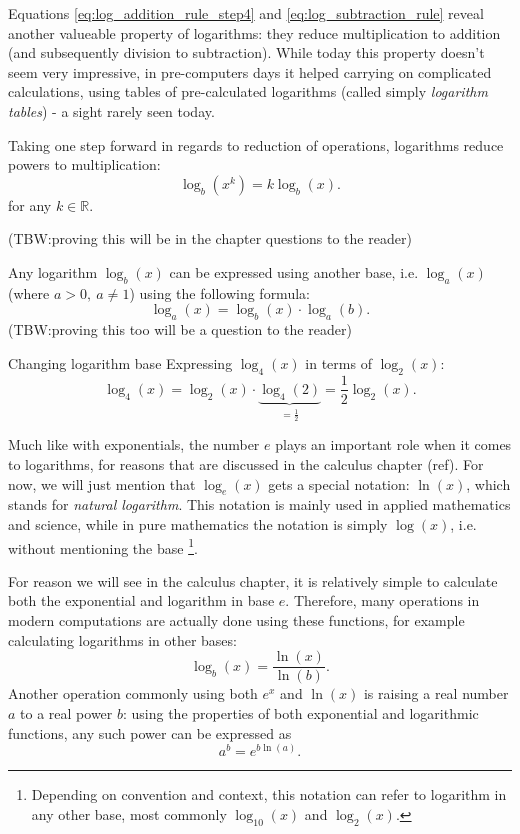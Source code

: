 Equations \ref{eq:log_addition_rule_step4} and \ref{eq:log_subtraction_rule} reveal another valueable property of logarithms: they reduce multiplication to addition (and subsequently division to subtraction). While today this property doesn't seem very impressive, in pre-computers days it helped carrying on complicated calculations, using tables of pre-calculated logarithms (called simply \emph{logarithm tables}) - a sight rarely seen today.

Taking one step forward in regards to reduction of operations, logarithms reduce powers to multiplication:
\begin{equation}
	\log_{b}\left( x^{k} \right) = k\log_{b}(x).
	\label{eq:log_product_rule}
\end{equation}
for any $k\in\mathbb{R}$.

(TBW:\@ proving this will be in the chapter questions to the reader)

Any logarithm $\log_{b}(x)$ can be expressed using another base, i.e. $\log_{a}(x)$ (where $a>0,\ a\neq1$) using the following formula:
\begin{equation}
	\log_{a}(x) = \log_{b}(x)\cdot\log_{a}(b).
	\label{eq:log_base_change}
\end{equation}
(TBW:\@ proving this too will be a question to the reader)

\begin{example}{Changing logarithm base}{}
	Expressing $\log_{4}(x)$ in terms of $\log_{2}(x)$:
	\[
		\log_{4}(x) = \log_{2}(x)\cdot\underbrace{\log_{4}(2)}_{=\frac{1}{2}} = \frac{1}{2}\log_{2}(x).
	\]
\end{example}

Much like with exponentials, the number $e$ plays an important role when it comes to logarithms, for reasons that are discussed in the calculus chapter (ref). For now, we will just mention that $\log_{e}(x)$ gets a special notation: $\ln(x)$, which stands for \emph{natural logarithm}. This notation is mainly used in applied mathematics and science, while in pure mathematics the notation is simply $\log(x)$, i.e. without mentioning the base \footnote{Depending on convention and context, this notation can refer to logarithm in any other base, most commonly $\log_{10}(x)$ and $\log_{2}(x)$.}.

For reason we will see in the calculus chapter, it is relatively simple to calculate both the exponential and logarithm in base $e$. Therefore, many operations in modern computations are actually done using these functions, for example calculating logarithms in other bases:
\begin{equation}
	\log_{b}(x) = \frac{\ln(x)}{\ln(b)}.
	\label{eq:ln_base_change}
\end{equation}
Another operation commonly using both $e^{x}$ and $\ln(x)$ is raising a real number $a$ to a real power $b$: using the properties of both exponential and logarithmic functions, any such power can be expressed as
\begin{equation}
	a^{b} = e^{b\ln(a)}.
	\label{eq:powers_using_e}
\end{equation}
